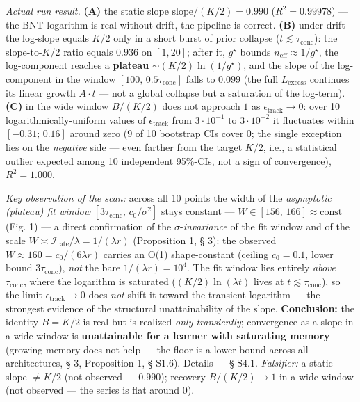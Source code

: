 \documentclass[12pt]{iopart}
\begin{document}
\emph{Actual run result.} \textbf{(A)} the static slope \(\mathrm{slope}/(K/2) = 0.990\) (\(R^2 = 0.99978\)) --- the BNT-logarithm is real without drift, the pipeline is correct. \textbf{(B)} under drift the log-slope equals \(K/2\) only in a short burst of prior collapse (\(t \lesssim \tau_{\text{conc}}\)): the slope-to-\(K/2\) ratio equals \(0.936\) on \([1,20]\); after it, \(g^\star\) bounds \(n_{\text{eff}} \approx 1/g^\star\), the log-component reaches a \textbf{plateau} \(\sim (K/2)\ln(1/g^\star)\), and the slope of the log-component in the window \([100,\,0.5\tau_{\text{conc}}]\) falls to \(0.099\) (the full \(L_{\text{excess}}\) continues its linear growth \(A\cdot t\) --- not a global collapse but a saturation of the log-term). \textbf{(C)} in the wide window \(B/(K/2)\) does not approach \(1\) as \(\epsilon_{\text{track}} \to 0\): over 10 logarithmically-uniform values of \(\epsilon_{\text{track}}\) from \(3\cdot10^{-1}\) to \(3\cdot10^{-2}\) it fluctuates within \([-0.31;\,0.16]\) around zero (9 of 10 bootstrap CIs cover \(0\); the single exception lies on the \emph{negative} side --- even farther from the target \(K/2\), i.e., a statistical outlier expected among 10 independent 95\%-CIs, not a sign of convergence), \(R^2 = 1.000\).



\emph{Key observation of the scan:} across all 10 points the width of the \emph{asymptotic (plateau) fit window} \([3\tau_{\text{conc}},\,c_0/\sigma^2]\) stays constant --- \(W \in [156,\,166] \approx \text{const}\) (Fig. 1) --- a direct confirmation of the \(\sigma\)-\emph{invariance} of the fit window and of the scale \(W \asymp \mathcal I_{\text{rate}}/\lambda = 1/(\lambda r)\) (Proposition 1, § 3): the observed \(W \approx 160 = c_0/(6\lambda r)\) carries an O(1) shape-constant (ceiling \(c_0 = 0.1\), lower bound \(3\tau_{\text{conc}}\)), \emph{not} the bare \(1/(\lambda r) = 10^4\). The fit window lies entirely \emph{above} \(\tau_{\text{conc}}\), where the logarithm is saturated (\((K/2)\ln(\lambda t)\) lives at \(t\lesssim\tau_{\text{conc}}\)), so the limit \(\epsilon_{\text{track}}\to0\) does \emph{not} shift it toward the transient logarithm --- the strongest evidence of the structural unattainability of the slope. \textbf{Conclusion:} the identity \(B = K/2\) is real but is realized \emph{only transiently}; convergence as a slope in a wide window is \textbf{unattainable for a learner with saturating memory} (growing memory does not help --- the floor is a lower bound across all architectures, § 3, Proposition 1, § S1.6). Details --- § S4.1. \emph{Falsifier:} a static slope \(\neq K/2\) (not observed --- \(0.990\)); recovery \(B/(K/2) \to 1\) in a wide window (not observed --- the series is flat around \(0\)).
\end{document}
